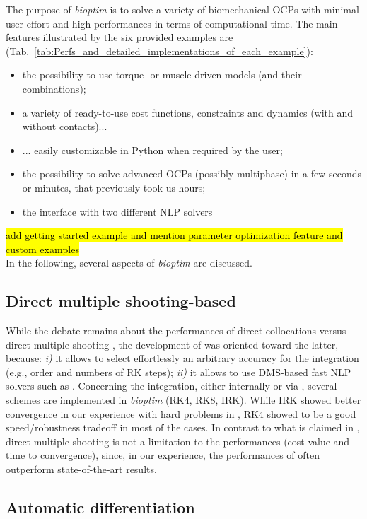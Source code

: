 The purpose of \textit{bioptim} is to solve a variety of biomechanical OCPs with minimal user effort and high performances in terms of computational time. 
The main features illustrated by the six provided examples are (Tab.~\ref{tab:Perfs_and_detailed_implementations_of_each_example}): 
\begin{itemize}
\item the possibility to use torque- or muscle-driven models (and their combinations);
\item a variety of ready-to-use cost functions, constraints and dynamics (with and without contacts)...
\item ... easily customizable in Python when required by the user;
\item the possibility to solve advanced OCPs (possibly multiphase) in a few seconds or minutes, that previously took us hours;
\item the interface with two different NLP solvers
\end{itemize}
\hl{add getting started example and mention parameter optimization feature and custom examples}\\
In the following, several aspects of \textit{bioptim} are discussed.


\subsection{Direct multiple shooting-based}

While the debate remains about the performances of direct collocations versus direct multiple shooting \cite{diehl2006fast, porsa2016direct}, the development of \bioptim was oriented toward the latter, because: \textit{i)} it allows to select effortlessly an arbitrary accuracy for the integration (e.g., order and numbers of RK steps); \textit{ii)} it allows to use DMS-based fast NLP solvers such as \acados.
Concerning the integration, either internally or via \acados, several schemes are implemented in \textit{bioptim} (RK4, RK8, IRK).
While IRK showed better convergence in our experience with hard problems in \acados, RK4 showed to be a good speed/robustness tradeoff in most of the cases. 
In contrast to what is claimed in \cite{porsa2016direct}, direct multiple shooting is not a limitation to the performances (cost value and time to convergence), since, in our experience, the performances of \bioptim often outperform state-of-the-art results.

\subsection{Automatic differentiation}

